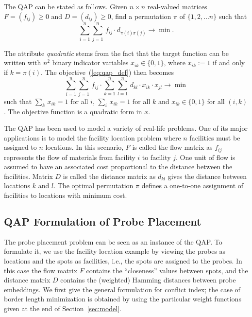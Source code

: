 \documentclass[english]{lni}
\begin{document}
The QAP can be stated as follows. Given $n \times n$ real-valued matrices $F =
(f_{ij})\geq 0$ and $D = (d_{ij})\geq 0$, find a permutation $\pi$ of $\{1, 2,
\ldots n\}$ such that
\begin{equation}\label{eq:qap_def}
  \sum_{i=1}^{n} \sum_{j=1}^{n}\,  f_{ij} \cdot d_{\pi(i)\pi(j)} \to \min.
\end{equation}

The attribute \emph{quadratic} stems from the fact that the target function
can be written with $n^2$ binary indicator variables $x_{ik}\in\{0,1\}$, where
$x_{ik}:=1$ if and only if $k=\pi(i)$. The objective~(\ref{eq:qap_def}) then
becomes
\begin{equation}\label{eq:qap_x}
  \sum_{i=1}^{n} \sum_{j=1}^{n}\,  f_{ij} \cdot 
  \sum_{k=1}^{n} \sum_{l=1}^{n}\,  d_{kl} \cdot x_{ik}\cdot x_{jl}
  \to \min
\end{equation}
such that $\sum_{k}\, x_{ik}=1$ for all $i$, $\sum_{i}\, x_{ik}=1$ for all $k$
and $x_{ik}\in\{0,1\}$ for all $(i,k)$. The objective function is a quadratic
form in $x$.

The QAP has been used to model a variety of real-life problems. One of its
major applications is to model the facility location problem where $n$
facilities must be assigned to $n$ locations. In this scenario, $F$ is called
the flow matrix as $f_{ij}$ represents the flow of materials from facility $i$
to facility $j$. One unit of flow is assumed to have an associated cost
proportional to the distance between the facilities. Matrix $D$ is called the
distance matrix as $d_{kl}$ gives the distance between locations $k$ and $l$.
The optimal permutation $\pi$ defines a one-to-one assignment of facilities to
locations with minimum cost.

\subsection{QAP Formulation of Probe Placement}
\label{sec:qap_form}

The probe placement problem can be seen as an instance of the QAP. To
formulate it, we use the facility location example by viewing the probes as
locations and the spots as facilities, i.e., the spots are assigned to the
probes. In this case the flow matrix $F$ contains the ``closeness'' values
between spots, and the distance matrix $D$ contains the (weighted) Hamming
distances between probe embeddings.  We first give the general formulation for
conflict index; the case of border length minimization is obtained by using
the particular weight functions given at the end of
Section~\ref{sec:model}.
\end{document}
